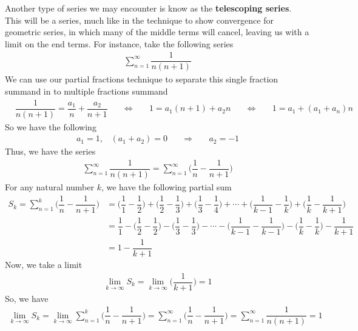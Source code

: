 \begin{example}
Another type of series we may encounter is know as the \textbf{telescoping series}. This will be a series, much like in the technique to show convergence for geometric series, in which many of the middle terms will cancel, leaving us with a limit on the end terms. For instance, take the following series
\begin{align*}
    \sum_{n = 1}^{\infty} \dfrac{1}{n(n+1)}
\end{align*}
We can use our partial fractions technique to separate this single fraction summand in to multiple fractions summand
\begin{align*}
    &\dfrac{1}{n(n+1)} = \dfrac{a_{1}}{n} + \dfrac{a_{2}}{n+1} \hspace{20pt} \Longleftrightarrow \hspace{20pt} 1 = a_{1}(n+1) + a_{2}n \hspace{20pt} \Longleftrightarrow \hspace{20pt} 1 = a_{1} + (a_{1} + a_{n})n
\end{align*}
So we have the following
\begin{align*}
    a_{1} = 1, \hspace{10pt} (a_{1} + a_{2}) = 0 \hspace{20pt} \Longrightarrow \hspace{20pt} a_{2} = -1
\end{align*}
Thus, we have the series
\begin{align*}
    \sum_{n = 1}^{\infty} \dfrac{1}{n(n+1)} = \sum_{n = 1}^{\infty} \Big(\dfrac{1}{n} - \dfrac{1}{n+1}\Big)
\end{align*}
For any natural number $k$, we have the following partial sum
\begin{align*}
    S_{k} = \sum_{n = 1}^{k} \Big(\dfrac{1}{n} - \dfrac{1}{n+1}\Big) &= \Big(\dfrac{1}{1} - \dfrac{1}{2}\Big) + \Big(\dfrac{1}{2} - \dfrac{1}{3}\Big) + \Big(\dfrac{1}{3} - \dfrac{1}{4}\Big) + \cdots + \Big(\dfrac{1}{k-1} - \dfrac{1}{k}\Big) + \Big(\dfrac{1}{k} - \dfrac{1}{k+1}\Big)\\[2ex]
    &= \dfrac{1}{1} - \Big(\dfrac{1}{2} - \dfrac{1}{2}\Big) - \Big(\dfrac{1}{3} - \dfrac{1}{3}\Big) - \cdots - \Big(\dfrac{1}{k-1} - \dfrac{1}{k-1}\Big) - \Big(\dfrac{1}{k} - \dfrac{1}{k}\Big) - \dfrac{1}{k+1}\\[2ex]
    &= 1 - \dfrac{1}{k+1}
\end{align*}
Now, we take a limit
\begin{align*}
    \lim_{k \longrightarrow \infty} S_{k} = \lim_{k \longrightarrow \infty} \Big(\dfrac{1}{k+1}\Big) = 1
\end{align*}
So, we have
\begin{align*}
    \lim_{k \longrightarrow \infty} S_{k} = \lim_{k \longrightarrow \infty} \sum_{n=1}^{k} \Big(\dfrac{1}{n} - \dfrac{1}{n+1}\Big) = \sum_{n=1}^{\infty} \Big(\dfrac{1}{n} - \dfrac{1}{n+1}\Big) = \sum_{n = 1}^{\infty} \dfrac{1}{n(n+1)} = 1
\end{align*}
\end{example}

